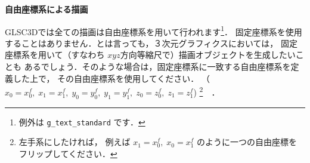 \documentclass[platex,a4paper,12pt]{jsarticle}%
\begin{document}

\noindent
{\bf 自由座標系による描画}

GLSC3Dでは全ての描画は自由座標系を用いて行われます\footnote{例外は \texttt{g\_text\_standard} です．}．
固定座標系を使用することはありません．とは言っても，３次元グラフィクスにおいては，
固定座標系を用いて（すなわち $xyz$方向等縮尺で）描画オブジェクトを生成したいことも
あるでしょう．そのような場合は，固定座標系に一致する自由座標系を定義した上で，
その自由座標系を使用してください．
（$x_{0} =x^{f}_{0}, \;x_{1} =x^{f}_{1}, \;y_{0} =y^{f}_{0}, \;y_{1} =y^{f}_{1}, \;z_{0} =z^{f}_{0}, \;z_{1} =z^{f}_{1}$) 
\footnote{左手系にしたければ，
例えば $x_{1} =x^{f}_{0}, \;x_{0} =x^{f}_{1}$ のように一つの自由座標をフリップしてください．}　．




\end{document}
